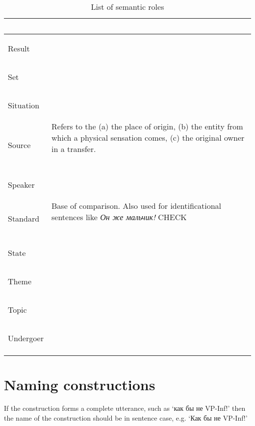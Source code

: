 \documentclass[a4paper,11pt, onecolumn,twoside]{article}
\begin{document}
\begin{longtable}{ p{}  p{} }
        & ~ \\
\midrule
 \multirow{2}{*}{Result} & ~ \\ 
        & ~ \\
\midrule
 \multirow{2}{*}{Set} & ~ \\ 
        & ~ \\
\midrule
 \multirow{2}{*}{Situation} & ~ \\ 
        & ~ \\
\midrule
 \multirow{2}{*}{Source} & Refers to the (a) the place of origin, (b) the entity from which a physical sensation comes, (c) the original owner in a transfer. \\ 
        & ~ \\
\midrule
 \multirow{2}{*}{Speaker} & ~ \\ 
        & ~ \\
\midrule
 \multirow{2}{*}{Standard} & Base of comparison. Also used for identificational sentences like \emph{Он же мальчик!} CHECK \\ %
        & ~ \\
\midrule
 \multirow{2}{*}{State} & ~ \\ 
        & ~ \\
\midrule
 \multirow{2}{*}{Theme} & ~ \\ 
        & ~ \\
\midrule
 \multirow{2}{*}{Topic} & ~ \\  %
        & ~ \\
\midrule
 \multirow{2}{*}{Undergoer} & ~ \\ %
        & ~ \\
\bottomrule
\caption{List of semantic roles}
\label{table:semroles}
\end{longtable}

\section{Naming constructions}
\label{sec:name}


If the construction forms a complete utterance, such as `как бы не VP-Inf!' then the 
name of the construction should be in sentence case, e.g. `Как бы не VP-Inf!'
\end{document}
